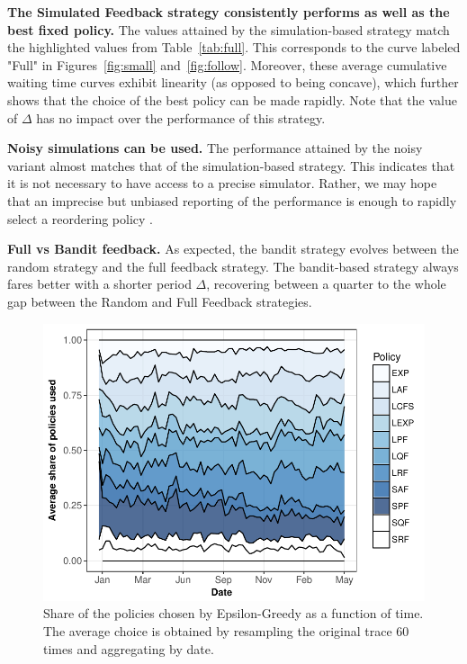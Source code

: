 \documentclass[sigconf,anonymous]{acmart}
\begin{document}
\textbf{The Simulated Feedback strategy consistently performs as well as the
best fixed policy.} The values attained by the simulation-based strategy match
the highlighted values from Table~\ref{tab:full}. This corresponds to the curve
labeled "Full" in Figures~\ref{fig:small} and~\ref{fig:follow}. Moreover,
these average cumulative waiting time curves exhibit linearity (as opposed to
being concave), which further shows that the choice of the best policy can be
made rapidly.  Note that the value of $\Delta$ has no impact over the
performance of this strategy.

\textbf{Noisy simulations can be used.} The performance attained by the noisy
variant almost matches that of the simulation-based strategy. This indicates
that it is not necessary to have access to a precise simulator. Rather, we may
hope that an imprecise but unbiased reporting of the performance is enough to
rapidly select a reordering policy .

\textbf{Full vs Bandit feedback.} As expected, the bandit strategy evolves
between the random strategy and the full feedback strategy. The bandit-based
strategy always fares better with a shorter period $\Delta$, recovering between
a quarter to the whole gap between the Random and Full Feedback strategies.

\begin{figure}[]
  \centering
  \includegraphics[scale=0.6]{figures/mosaicbandit-ANL-Intr.pdf}

  \caption{Share of the policies chosen by Epsilon-Greedy as a function of
  time. The average choice is obtained by resampling the original trace 60 
times and aggregating by date.}

  \label{fig:mosb}
\end{figure}
\end{document}

